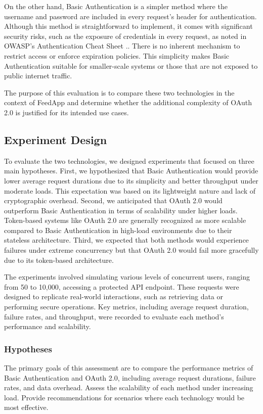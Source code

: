 On the other hand, Basic Authentication is a simpler method where the username and password are included in every request’s header for authentication. Although this method is straightforward to implement, it comes with significant security risks, such as the exposure of credentials in every request, as noted in OWASP’s Authentication Cheat Sheet \cite{owasp:authcheatsheet}.. There is no inherent mechanism to restrict access or enforce expiration policies. This simplicity makes Basic Authentication suitable for smaller-scale systems or those that are not exposed to public internet traffic.

The purpose of this evaluation is to compare these two technologies in the context of FeedApp and determine whether the additional complexity of OAuth 2.0 is justified for its intended use cases.

\subsection{Experiment Design}
To evaluate the two technologies, we designed experiments that focused on three main hypotheses. First, we hypothesized that Basic Authentication would provide lower average request durations due to its simplicity and better throughput under moderate loads. This expectation was based on its lightweight nature and lack of cryptographic overhead. Second, we anticipated that OAuth 2.0 would outperform Basic Authentication in terms of scalability under higher loads. Token-based systems like OAuth 2.0 are generally recognized as more scalable compared to Basic Authentication in high-load environments due to their stateless architecture. Third, we expected that both methods would experience failures under extreme concurrency but that OAuth 2.0 would fail more gracefully due to its token-based architecture.

The experiments involved simulating various levels of concurrent users, ranging from 50 to 10,000, accessing a protected API endpoint. These requests were designed to replicate real-world interactions, such as retrieving data or performing secure operations. Key metrics, including average request duration, failure rates, and throughput, were recorded to evaluate each method’s performance and scalability.

\subsubsection*{Hypotheses}
The primary goals of this assessment are to compare the performance metrics of Basic Authentication and OAuth 2.0, including average request durations, failure rates, and data overhead. Assess the scalability of each method under increasing load. Provide recommendations for scenarios where each technology would be most effective.

